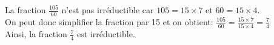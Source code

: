 
La fraction $\frac{105}{60}$ n'est pas irréductible car $105=15 \times 7$ et $60=15 \times 4$.\\
On peut donc simplifier la fraction par 15 et on obtient: $\frac{105}{60}=\frac{15 \times 7}{15 \times 4}=\frac{7}{4}$\\
 Ainsi, la fraction $\frac{7}{4}$ est irréductible.
 

